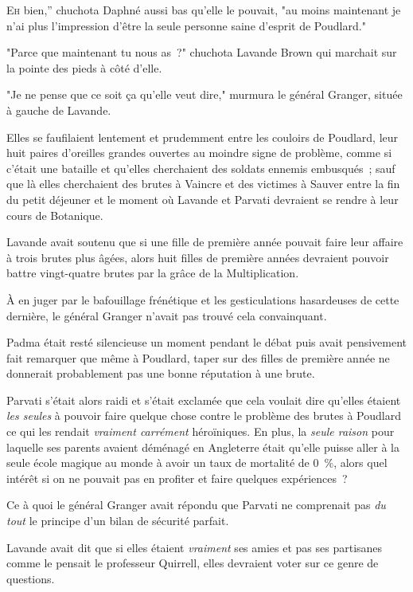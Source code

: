 
\lettrine[ante=<<~]{E}{h} bien,” chuchota Daphné aussi bas qu'elle le pouvait, "au moins maintenant je n'ai plus l'impression d'être la seule personne saine d'esprit de Poudlard."

"Parce que maintenant tu nous as~?" chuchota Lavande Brown qui marchait sur la pointe des pieds à côté d'elle.

"Je ne pense que ce soit ça qu'elle veut dire," murmura le général Granger, située à gauche de Lavande.

Elles se faufilaient lentement et prudemment entre les couloirs de Poudlard, leur huit paires d'oreilles grandes ouvertes au moindre signe de problème, comme si c'était une bataille et qu'elles cherchaient des soldats ennemis embusqués~; sauf que là elles cherchaient des brutes à Vaincre et des victimes à Sauver entre la fin du petit déjeuner et le moment où Lavande et Parvati devraient se rendre à leur cours de Botanique.

Lavande avait soutenu que si une fille de première année pouvait faire leur affaire à trois brutes plus âgées, alors huit filles de première années devraient pouvoir battre vingt-quatre brutes par la grâce de la Multiplication.

À en juger par le bafouillage frénétique et les gesticulations hasardeuses de cette dernière, le général Granger n'avait pas trouvé cela convainquant.

Padma était resté silencieuse un moment pendant le débat puis avait pensivement fait remarquer que même à Poudlard, taper sur des filles de première année ne donnerait probablement pas une bonne réputation à une brute.

Parvati s'était alors raidi et s'était exclamée que cela voulait dire qu'elles étaient \emph{les seules} à pouvoir faire quelque chose contre le problème des brutes à Poudlard ce qui les rendait \emph{vraiment carrément} héroïniques. En plus, la \emph{seule raison} pour laquelle ses parents avaient déménagé en Angleterre était qu'elle puisse aller à la seule école magique au monde à avoir un taux de mortalité de 0~\%, alors quel intérêt si on ne pouvait pas en profiter et faire quelques expériences~?

Ce à quoi le général Granger avait répondu que Parvati ne comprenait pas \emph{du tout} le principe d'un bilan de sécurité parfait.

Lavande avait dit que si elles étaient \emph{vraiment} ses amies et pas ses partisanes comme le pensait le professeur Quirrell, elles devraient voter sur ce genre de questions.


